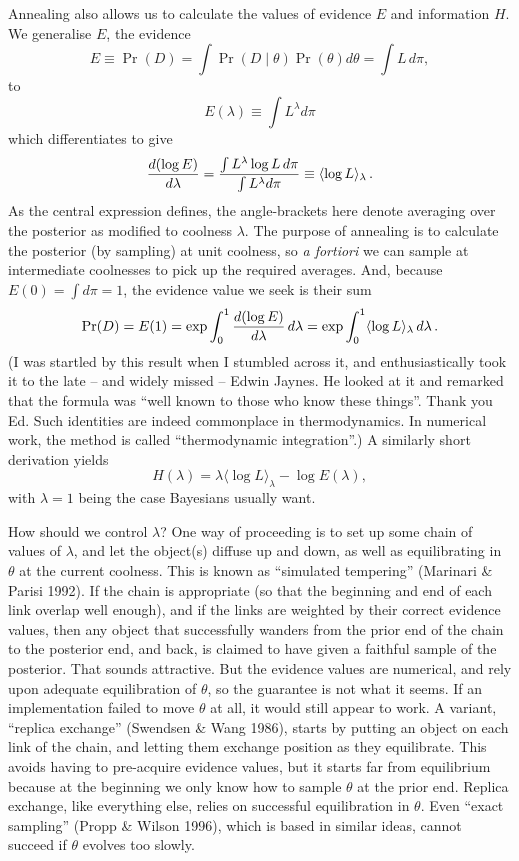 Annealing also allows us to calculate the values of evidence $E$ and information $H$.  
We generalise $E$, the evidence
$$
    E \equiv \Pr(D) = \int \Pr(D \mid \theta) \Pr(\theta) d\theta
      = \int L\,d\pi,
$$
to
$$
    E(\lambda) \equiv \int L^\lambda d\pi
$$
which differentiates to give
$$
 {d(\log E) \over d\lambda}
   = {\int L^\lambda \log L \,d\pi \over \int L^\lambda d\pi}
   \equiv \langle \log L \rangle_\lambda\,.
$$
As the central expression defines, the angle-brackets here denote averaging over the posterior as modified to coolness $\lambda$.
The purpose of annealing is to calculate the posterior (by sampling) at unit coolness, 
so {\it a fortiori} we can sample at intermediate coolnesses to pick up the required averages.
And, because $E(0) = \int d\pi = 1$, the evidence value we seek is their sum
$$
    \Pr(D) = E(1) = \exp \int_0^1 {d(\log E) \over d\lambda}\,d\lambda = \exp \int_0^1 \langle \log L \rangle_\lambda\,d\lambda\,.
$$
(I was startled by this result when I stumbled across it, and enthusiastically took it to the late -- and widely missed -- Edwin Jaynes.
He looked at it and remarked that the formula was ``well known to those who know these things''.
Thank you Ed.  Such identities are indeed commonplace in thermodynamics.
In numerical work, the method is called ``thermodynamic integration''.)
A similarly short derivation yields
$$
    H(\lambda) = \lambda \langle \log L \rangle_\lambda - \log E(\lambda),
$$
with $\lambda = 1$ being the case Bayesians usually want.

How should we control $\lambda$?
One way of proceeding is to set up some chain of values of $\lambda$, and let the object(s) diffuse up and down, 
as well as equilibrating in $\theta$ at the current coolness.
This is known as ``simulated tempering'' (Marinari \& Parisi 1992).
If the chain is appropriate (so that the beginning and end of each link overlap well enough), and if the links are weighted by their correct evidence values, 
then any object that successfully wanders from the prior end of the chain to the posterior end, and back, 
is claimed to have given a faithful sample of the posterior.
That sounds attractive.  But the evidence values are numerical, and rely upon adequate equilibration of $\theta$, so the guarantee is not what it seems.  
If an implementation failed to move $\theta$ at all, it would still appear to work.  
A variant, ``replica exchange'' (Swendsen \& Wang 1986), starts by putting an object on each link of the chain, and letting them exchange position as they equilibrate.  
This avoids having to pre-acquire evidence values, but it starts far from equilibrium because at the beginning we only know how to sample $\theta$ at the prior end.
Replica exchange, like everything else, relies on successful equilibration in $\theta$.
Even ``exact sampling'' (Propp \& Wilson 1996), which is based in similar ideas, cannot succeed if $\theta$ evolves too slowly.

